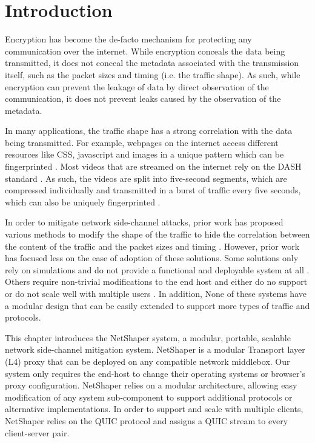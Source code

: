 \section{Introduction}
\label{sec:netshaper-intro}

Encryption has become the de-facto mechanism for protecting any communication over the internet. 
While encryption conceals the data being transmitted, it does not conceal the metadata associated with the transmission itself, such as the packet sizes and timing (i.e. the traffic shape).
As such, while encryption can prevent the leakage of data by direct observation of the communication, it does not prevent leaks caused by the observation of the metadata.

In many applications, the traffic shape has a strong correlation with the data being transmitted.
For example, webpages on the internet access different resources like CSS, javascript and images in a unique pattern which can be fingerprinted \cite{gong2010fingerprinting, bhat2019varcnn, wang2014supersequence}.
Most videos that are streamed on the internet rely on the DASH standard \cite{dash2013}.
As such, the videos are split into five-second segments, which are compressed individually and transmitted in a burst of traffic every five seconds, which can also be uniquely fingerprinted \cite{schuster2017beautyburst}.

In order to mitigate network side-channel attacks, prior work has proposed various methods to modify the shape of the traffic to hide the correlation between the content of the traffic and the packet sizes and timing \cite{hou2020wf, nasr2021blind, rahman2020mockingbird, shan2021dolos, wang2017walkie, wright2009traffic, mehta2022pacer, zhang2019statistical, cai2014csbuflo}.
However, prior work has focused less on the ease of adoption of these solutions. 
Some solutions only rely on simulations and do not provide a functional and deployable system at all \cite{wang2014supersequence, nithyanand2014glove, cai2014tamaraw}. 
Others require non-trivial modifications to the end host and either do no support or do not scale well with multiple users \cite{cai2014csbuflo, mehta2022pacer}.
In addition, None of these systems have a modular design that can be easily extended to support more types of traffic and protocols.

This chapter introduces the NetShaper system, a modular, portable, scalable network side-channel mitigation system.
NetShaper is a modular Transport layer (L4) proxy that can be deployed on any compatible network middlebox.
Our system only requires the end-host to change their operating systems or browser's proxy configuration.
NetShaper relies on a modular architecture, allowing easy modification of any system sub-component to support additional protocols or alternative implementations.
In order to support and scale with multiple clients, NetShaper relies on the QUIC protocol and assigns a QUIC stream to every client-server pair.

